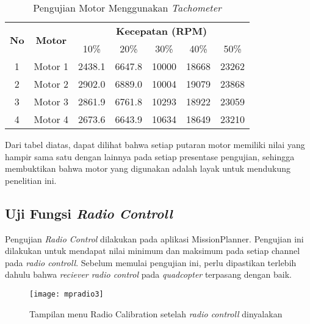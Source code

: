 \begin{table}[H]
	\caption{Pengujian Motor Menggunakan \textit{Tachometer}}
	\label{tab:tachometer}
	\centering
	\begin{tabular}{|c|c|ccccc|}
		\hline
		\multirow{2}{*}{\textbf{No}} & \multirow{2}{*}{\textbf{Motor}} & \multicolumn{5}{c|}{\textbf{Kecepatan (RPM)}}                                                                                        \\ \cline{3-7} 
		&                        & \multicolumn{1}{c|}{10\%}   & \multicolumn{1}{c|}{20\%}   & \multicolumn{1}{c|}{30\%}  & \multicolumn{1}{c|}{40\%}  & 50\%  \\ \hline
		1                   & Motor 1                & \multicolumn{1}{c|}{2438.1} & \multicolumn{1}{c|}{6647.8} & \multicolumn{1}{c|}{10000} & \multicolumn{1}{c|}{18668} & 23262 \\ \hline
		2                   & Motor 2                & \multicolumn{1}{c|}{2902.0} & \multicolumn{1}{c|}{6889.0} & \multicolumn{1}{c|}{10004} & \multicolumn{1}{c|}{19079} & 23868 \\ \hline
		3                   & Motor 3                & \multicolumn{1}{c|}{2861.9} & \multicolumn{1}{c|}{6761.8} & \multicolumn{1}{c|}{10293} & \multicolumn{1}{c|}{18922} & 23059 \\ \hline
		4                   & Motor 4                & \multicolumn{1}{c|}{2673.6} & \multicolumn{1}{c|}{6643.9} & \multicolumn{1}{c|}{10634} & \multicolumn{1}{c|}{18649} & 23210 \\ \hline
	\end{tabular}
\end{table}

Dari tabel diatas, dapat dilihat bahwa setiap putaran motor memiliki nilai yang hampir sama satu dengan lainnya pada setiap presentase pengujian, sehingga membuktikan bahwa motor yang digunakan adalah layak untuk mendukung penelitian ini.

\subsection{Uji Fungsi \textit{Radio Controll}}
Pengujian \textit{Radio Control} dilakukan pada aplikasi MissionPlanner. Pengujian ini dilakukan untuk mendapat nilai minimum dan maksimum pada setiap channel pada \textit{radio controll}. Sebelum memulai pengujian ini, perlu dipastikan terlebih dahulu bahwa \textit{reciever radio control} pada \textit{quadcopter} terpasang dengan baik. 

\begin{figure}[H]
	\centering
	\texttt{[image: mpradio3]}
	\caption{Tampilan menu Radio Calibration setelah \textit{radio controll} dinyalakan}
	\label{fig:mpradio3}
\end{figure}

